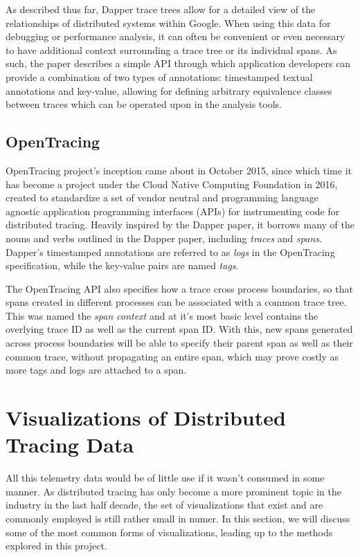 \documentclass[pdftex,titlepage]{article}
\begin{document}
        As described thus far, Dapper trace trees allow for a detailed view of the relationships of distributed systems within
        Google. When using this data for debugging or performance analysis, it can often be convenient or even necessary to 
        have additional context surrounding a trace tree or its individual spans. As such, the paper describes a simple API 
        through which application developers can provide a combination of two types of annotations: timestamped textual annotations
        and key-value, allowing for defining arbitrary equivalence classes between traces which can be operated upon in the analysis
        tools.

        \subsection{OpenTracing}
        OpenTracing project's inception came about in October 2015, since which time it has become a project under the Cloud Native
        Computing Foundation in 2016, created to standardize a set of vendor neutral and programming language agnostic
        application programming interfaces (APIs) for instrumenting code for distributed tracing. Heavily inspired by the Dapper
        paper, it borrows many of the nouns and verbs outlined in the Dapper paper, including \textit{traces} and \textit{spans}.
        Dapper's timestamped annotations are referred to as \textit{logs} in the OpenTracing specification, while the key-value pairs
        are named \textit{tags}. 

        The OpenTracing API also specifies how a trace cross process boundaries, so that spans created in different processes can be
        associated with a common trace tree. This was named the \textit{span context} and at it's most basic level contains the 
        overlying trace ID as well as the current span ID. With this, new spans generated across process boundaries will be able
        to specify their parent span as well as their common trace, without propagating an entire span, which may prove costly as more
        tags and logs are attached to a span.
        
    \section{Visualizations of Distributed Tracing Data}
    All this telemetry data would be of little use if it wasn't consumed in some manner. As distributed tracing has only become a more
    prominent topic in the industry in the last half decade, the set of visualizations that exist and are commonly employed is still rather
    small in numer. In this section, we will discuss some of the most common forms of visualizations, leading up to the methods explored in this project.
    
\end{document}
